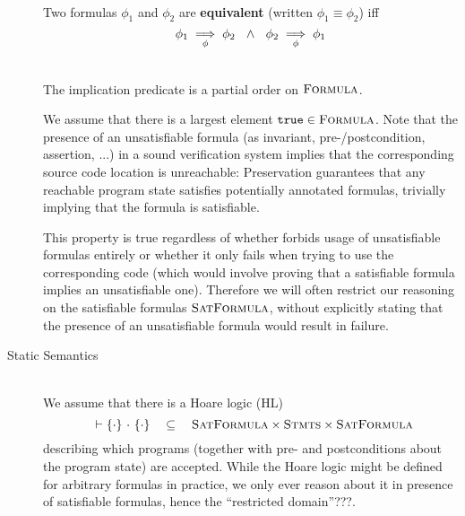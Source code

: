 \begin{description}
    \begin{definition}~\\
        Two formulas $\phi_1$ and $\phi_2$ are \textbf{equivalent} (written $\phi_1 \equiv \phi_2$) iff
        \begin{displaymath}
        {\phi_1} \underset{\phi}{\implies} {\phi_2} ~~\wedge~~ {\phi_2} \underset{\phi}{\implies} {\phi_1}
        \end{displaymath}
    \end{definition} 
    
    
    \begin{lemma}~\\
        The implication predicate is a partial order on $\textsc{Formula}$.
    \end{lemma}
    
    We assume that there is a largest element $\texttt{true} \in \textsc{Formula}$.
    Note that the presence of an unsatisfiable formula (as invariant, pre-/postcondition, assertion, ...) in a sound verification system implies that the corresponding source code location is unreachable:
    Preservation guarantees that any reachable program state satisfies potentially annotated formulas, trivially implying that the formula is satisfiable.
    
    This property is true regardless of whether \gsvl forbids usage of unsatisfiable formulas entirely or whether it only fails when trying to use the corresponding code (which would involve proving that a satisfiable formula implies an unsatisfiable one).
    Therefore we will often restrict our reasoning on the satisfiable formulas $\textsc{SatFormula}$, without explicitly stating that the presence of an unsatisfiable formula would result in failure.
    
\item[Static Semantics]~\\
    We assume that there is a Hoare logic (HL)
    \begin{displaymath}
    {~} \vdash \{{\cdot}\} ~{\cdot}~ \{{\cdot}\} ~~~\subseteq~~~ \textsc{SatFormula} \times \textsc{Stmts} \times \textsc{SatFormula}
    \end{displaymath}
    describing which programs (together with pre- and postconditions about the program state) are accepted.
    While the Hoare logic might be defined for arbitrary formulas in practice, we only ever reason about it in presence of satisfiable formulas, hence the “restricted domain”???.
    

\end{description}
